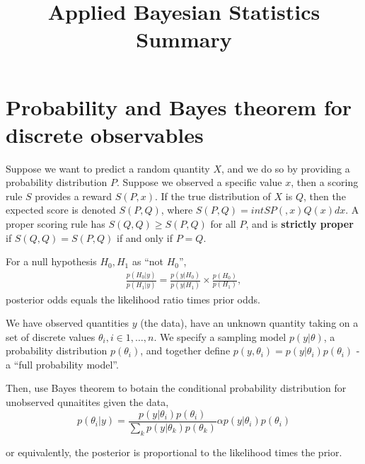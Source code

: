 

\title{Applied Bayesian Statistics Summary}



\maketitle

\section{Probability and Bayes theorem for discrete observables}
\label{sec:prob-bayes-theorobservables}

\begin{defn}
  \label{sec:prob-bayes-theor-1}
  Suppose we want to predict a random quantity $X$, and we do so by
  providing a probability distribution $P$.  Suppose we observed a
  specific value $x$, then a scoring rule $S$ provides a reward $S(P,
  x)$.  If the true distribution of $X$ is $Q$, then the expected
  score is denoted $S(P, Q)$, where $S(P, Q) = int SP(, x) Q(x) dx$.
  A proper scoring rule has $S(Q, Q) \geq S(P, Q)$ for all $P$, and is
  \textbf{strictly proper} if $S(Q, Q) = S(P, Q)$ if and only if $P = Q.$
\end{defn}

\begin{thm}
  \label{sec:prob-bayes-theor-2}
  For a null hypothesis $H_{0}, H_{1}$ as ``not $H_{0}$'',
  \begin{align}
    \label{eq:1}
    \frac{p(H_{0} | y)}{p(H_{1} | y)}  = \frac{p(y | H_{0})}{p(y |
      H_{1})} \times \frac{p(H_{0})}{p(H_{1})},
  \end{align}
  posterior odds equals the likelihood ratio times prior odds.
\end{thm}

\begin{defn}
  \label{sec:prob-bayes-theor-3}
  We have observed quantities $y$ (the data), have an unknown
  quantity taking on a set of discrete values $\theta_{i}, i \in 1,
  \dots, n$.  We specify a sampling model $p(y | \theta)$, a
  probability distribution $p(\theta_{i})$, and together define $p(y,
  \theta_{i}) = p(y | \theta_{i}) p(\theta_{i})$ - a ``full
  probability model''.

  Then, use Bayes theorem to botain the conditional probability
  distribution for unobserved qunaitites given the data,
  \begin{equation}
    \label{eq:2}
    p(\theta_{i} | y) = \frac{p(y | \theta_{i})
      p(\theta_{i})}{\sum_{k}^{} p(y | \theta_{k}) p(\theta_{k})}
    \alpha p(y | \theta_{i}) p(\theta_{i})
  \end{equation}

  or equivalently, the posterior is proportional to the likelihood
  times the prior.
\end{defn}

